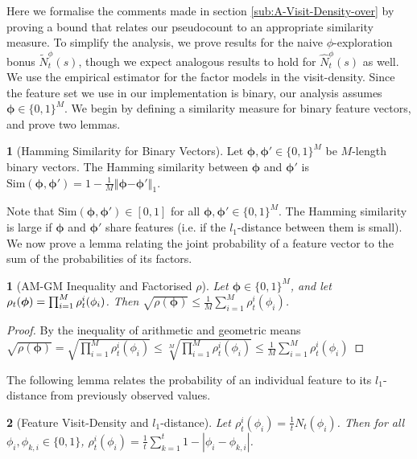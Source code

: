 \documentclass{article}
\theoremstyle{definition}
\newtheorem{defn}{\protect\definitionname}
\theoremstyle{definition}
\theoremstyle{plain}
\newtheorem{lem}{\protect\lemmaname}
\theoremstyle{plain}
\theoremstyle{plain}
\providecommand{\definitionname}{Definition}
\providecommand{\lemmaname}{Lemma}
\begin{document}
\noindent Here we formalise the comments made in section \ref{sub:A-Visit-Density-over}
by proving a bound that relates our pseudocount to an appropriate
similarity measure. To simplify the analysis, we prove results for
the naive $\phi$-exploration bonus $\tilde{N}_{t}^{\phi}(s)$, though
we expect analogous results to hold for $\hat{N}_{t}^{\phi}(s)$ as
well. We use the empirical estimator for the factor models in the
visit-density. Since the feature set we use in our implementation
is binary, our analysis assumes $\bm{\phi}\in\{0,1\}^{M}$. We begin
by defining a similarity measure for binary feature vectors, and prove
two lemmas.
\begin{defn}[Hamming Similarity for Binary Vectors]
\noindent \label{df:l1similarity} Let $\bm{\phi},\bm{\phi'}\in\{0,1\}^{M}$
be $M$-length binary vectors. The Hamming similarity between $\bm{\phi}$
and $\bm{\phi'}$ is $\mbox{Sim}(\bm{\phi},\bm{\phi'})=1-\frac{1}{M}\left\Vert \bm{\phi}\bm{-\phi'}\right\Vert _{1}$.
\end{defn}
\noindent Note that $\mbox{Sim}(\bm{\phi},\bm{\phi'})\in[0,1]$ for
all $\bm{\phi},\bm{\phi'}\in\{0,1\}^{M}$. The Hamming similarity
is large if $\bm{\phi}$ and $\bm{\phi'}$ share features (i.e. if
the $l_{1}$-distance between them is small). We now prove a lemma
relating the joint probability of a feature vector to the sum of the
probabilities of its factors.
\begin{lem}[AM-GM Inequality and Factorised $\rho$]
\noindent \label{lm:AMGM} Let $\bm{\phi}\in\{0,1\}^{M}$, and let
$\rho_{t}(\mbox{\ensuremath{\bm{\phi}}})=\prod_{i=1}^{M}\rho_{t}^{i}(\phi_{i})$.
Then $\sqrt{\rho(\bm{\phi})}\leq\frac{1}{M}\sum_{i=1}^{M}\rho_{t}^{i}(\phi_{i})$.\end{lem}
\begin{proof}
By the inequality of arithmetic and geometric means $\sqrt{\rho(\bm{\phi})}=\sqrt{\prod_{i=1}^{M}\rho_{t}^{i}(\phi_{i})}\leq\sqrt[M]{\prod_{i=1}^{M}\rho_{t}^{i}(\phi_{i})}\leq\frac{1}{M}\sum_{i=1}^{M}\rho_{t}^{i}(\phi_{i})$ 
\end{proof}
\noindent The following lemma relates the probability of an individual
feature to its $l_{1}$-distance from previously observed values.
\begin{lem}[Feature Visit-Density and $l_{1}$-distance]
\label{lm:comp_dist} Let \textup{$\rho_{t}^{i}(\phi_{i})=\frac{1}{t}N_{t}(\phi_{i})$.}
Then for all $\phi_{i},\phi_{k,i}\in\{0,1\}$, \textup{$\rho_{t}^{i}(\phi_{i})=\frac{1}{t}\sum_{k=1}^{t}1-\left|\phi_{i}-\phi_{k,i}\right|$.}\end{lem}
\end{document}
